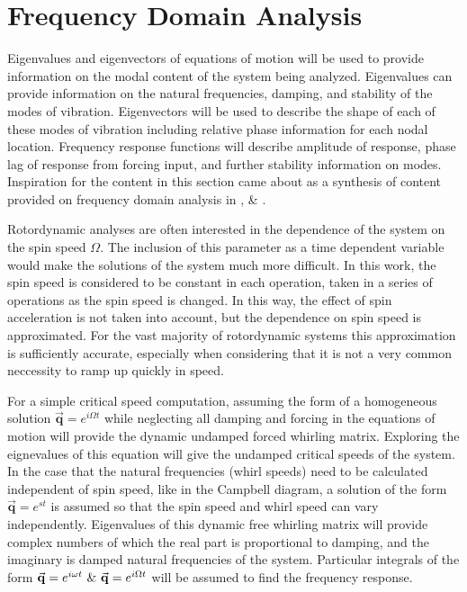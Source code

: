 \chapter{Frequency Domain Analysis}\label{FrequencyDomainAnalysis}
Eigenvalues and eigenvectors of equations of motion will be used to provide information on the modal content of the system being analyzed. Eigenvalues can provide information on the natural frequencies, damping, and stability of the modes of vibration. Eigenvectors will be used to describe the shape of each of these modes of vibration including relative phase information for each nodal location. Frequency response functions will describe amplitude of response, phase lag of response from forcing input, and further stability information on modes. Inspiration for the content in this section came about as a synthesis of content provided on frequency domain analysis in \cite{craig2006fundamentals}, \& \cite{genta2007dynamics}.\par
Rotordynamic analyses are often interested in the dependence of the system on the spin speed $ \Omega $. The inclusion of this parameter as a time dependent variable would make the solutions of the system much more difficult. In this work, the spin speed is considered to be constant in each operation, taken in a series of operations as the spin speed is changed. In this way, the effect of spin acceleration is not taken into account, but the dependence on spin speed is approximated. For the vast majority of rotordynamic systems this approximation is sufficiently accurate, especially when considering that it is not a very common neccessity to ramp up quickly in speed.\par
For a simple critical speed computation, assuming the form of a homogeneous solution $ \vec{\mathbf{q}}=e^{i\Omega t} $ while neglecting all damping and forcing in the equations of motion will provide the dynamic undamped forced whirling matrix. Exploring the eignevalues of this equation will give the undamped critical speeds of the system. In the case that the natural frequencies (whirl speeds) need to be calculated independent of spin speed, like in the Campbell diagram, a solution of the form $  \vec{\mathbf{q}}=e^{s t}$ is assumed so that the spin speed and whirl speed can vary independently. Eigenvalues of this dynamic free whirling matrix will provide complex numbers of which the real part is proportional to damping, and the imaginary is damped natural frequencies of the system. Particular integrals of the form $ \vec{\mathbf{q}}=e^{i\omega t}\ \&\ \vec{\mathbf{q}}=e^{i\Omega t} $ will be assumed to find the frequency response.\par 
